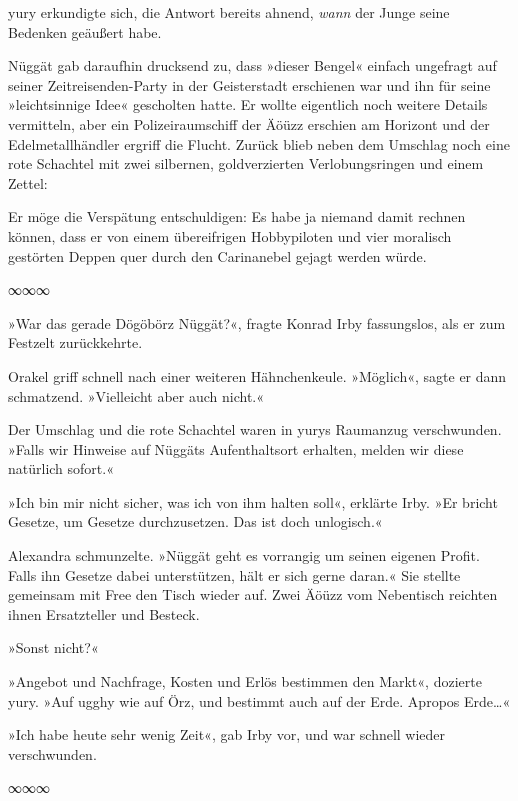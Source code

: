 yury erkundigte sich, die Antwort bereits ahnend, \emph{wann} der Junge seine Bedenken geäußert habe.

Nüggät gab daraufhin drucksend zu, dass »dieser Bengel« einfach ungefragt auf seiner Zeitreisenden-Party in der Geisterstadt erschienen war und ihn für seine »leichtsinnige Idee« gescholten hatte. Er wollte eigentlich noch weitere Details vermitteln, aber ein Polizeiraumschiff der Äöüzz erschien am Horizont und der Edelmetallhändler ergriff die Flucht. Zurück blieb neben dem Umschlag noch eine rote Schachtel mit zwei silbernen, goldverzierten Verlobungsringen und einem Zettel:

 Er möge die Verspätung entschuldigen: Es habe ja niemand damit rechnen können, dass er von einem übereifrigen Hobbypiloten und vier moralisch gestörten Deppen quer durch den Carinanebel gejagt werden würde.

\begin{center}
∞∞∞
\end{center}

»War das gerade Dögöbörz Nüggät?«, fragte Konrad Irby fassungslos, als er zum Festzelt zurückkehrte.

Orakel griff schnell nach einer weiteren Hähnchenkeule. »Möglich«, sagte er dann schmatzend. »Vielleicht aber auch nicht.«

Der Umschlag und die rote Schachtel waren in yurys Raumanzug verschwunden. »Falls wir Hinweise auf Nüggäts Aufenthaltsort erhalten, melden wir diese natürlich sofort.«

»Ich bin mir nicht sicher, was ich von ihm halten soll«, erklärte Irby. »Er bricht Gesetze, um Gesetze durchzusetzen. Das ist doch unlogisch.«

Alexandra schmunzelte. »Nüggät geht es vorrangig um seinen eigenen Profit. Falls ihn Gesetze dabei unterstützen, hält er sich gerne daran.« Sie stellte gemeinsam mit Free den Tisch wieder auf. Zwei Äöüzz vom Nebentisch reichten ihnen Ersatzteller und Besteck.

»Sonst nicht?«

»Angebot und Nachfrage, Kosten und Erlös bestimmen den Markt«, dozierte yury. »Auf ugghy wie auf Örz, und bestimmt auch auf der Erde. Apropos Erde…«

»Ich habe heute sehr wenig Zeit«, gab Irby vor, und war schnell wieder verschwunden.

\begin{center}
∞∞∞
\end{center}

